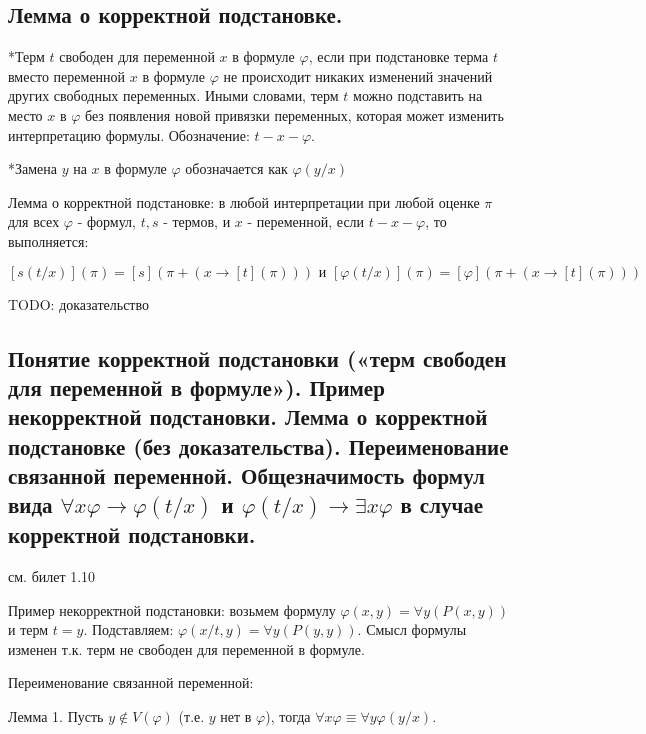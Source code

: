 \documentclass[a4paper, 10pt]{article}
\begin{document}
\subsection{Лемма о корректной подстановке.}

*Терм $t$ свободен для переменной $x$ в формуле $\varphi$, если при подстановке терма $t$ вместо переменной $x$ в формуле $\varphi$ не происходит никаких изменений значений других свободных переменных. Иными словами, терм $t$ можно подставить на место $x$ в $\varphi$ без появления новой привязки переменных, которая может изменить интерпретацию формулы. Обозначение: $t-x-\varphi$.

*Замена $y$ на $x$ в формуле $\varphi$ обозначается как $\varphi(y/x)$

Лемма о корректной подстановке: в любой интерпретации при любой оценке $\pi$ для всех $\varphi$ - формул, $t,s$ - термов, и $x$ - переменной, если $t-x-\varphi$, то выполняется:

$$ [s(t/x)](\pi) = [s](\pi + (x \to [t](\pi))) \text{ и } [\varphi(t/x)](\pi)=[\varphi](\pi + (x\to [t](\pi))) $$

TODO: доказательство

\subsection{Понятие корректной подстановки («терм свободен для переменной в формуле»). Пример некорректной подстановки. Лемма о корректной подстановке (без доказательства). Переименование связанной переменной. Общезначимость формул вида $\forall x\varphi \to \varphi(t/x)$ и $\varphi(t/x) \to \exists x \varphi$ в случае корректной подстановки.}

см. билет 1.10

Пример некорректной подстановки: возьмем формулу $\varphi(x,y)=\forall y (P(x,y))$ и терм $t=y$. Подставляем: $\varphi(x/t,y)=\forall y (P(y,y))$. Смысл формулы изменен т.к. терм не свободен для переменной в формуле.

\hfill

Переименование связанной переменной:

Лемма 1. Пусть $y\not\in V(\varphi)$ (т.е. $y$ нет в $\varphi$), тогда $\forall x\varphi \equiv \forall y\varphi(y/x)$.
\end{document}
